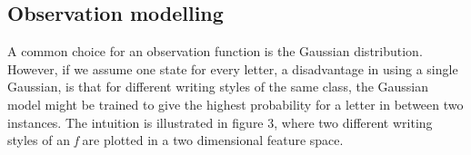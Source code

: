 \documentclass[conference]{IEEEtran}
\begin{document}
\subsection{Observation modelling}
A common choice for an observation function is the Gaussian distribution. However, if we assume one state for every letter, a disadvantage in using a single Gaussian, is that for different writing styles of the same class, the Gaussian model might be trained to give the highest probability for a letter in between two instances. The intuition is illustrated in figure 3, where two different writing styles of an {\it f} are plotted in a two dimensional feature space.
\begin{figure}[ht]
  \centering
\end{figure}
\end{document}
